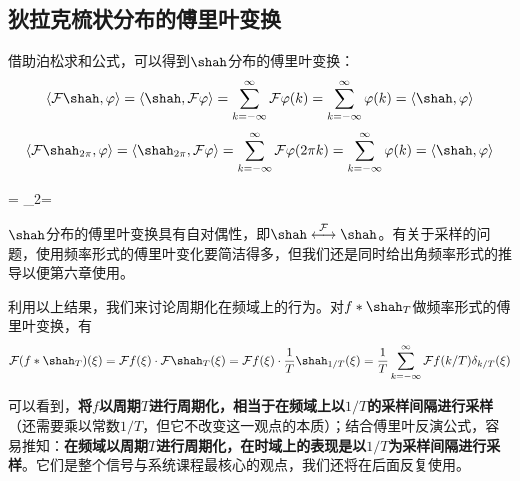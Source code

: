 
\subsection{狄拉克梳状分布的傅里叶变换}\label{sub:fourier_of_dirac_comb}
借助泊松求和公式，可以得到$\shah$分布的傅里叶变换：
{\color{blue}\begin{align*}
    \left\langle \mathcal{F} \shah,\varphi \right\rangle=\left\langle \shah,\mathcal{F} \varphi\right\rangle=\sum_{k=-\infty}^{\infty}\mathcal{F} \varphi(k)=\sum_{k=-\infty}^{\infty}\varphi(k)=\left\langle \shah,\varphi\right\rangle
\end{align*}}
{\color{red}\begin{align*}
    \left\langle \mathcal{F} \shah_{2\pi},\varphi \right\rangle=\left\langle \shah_{2\pi},\mathcal{F} \varphi\right\rangle=\sum_{k=-\infty}^{\infty}\mathcal{F} \varphi(2\pi k)=\sum_{k=-\infty}^{\infty}\varphi(k)=\left\langle \shah,\varphi\right\rangle
\end{align*}}

\begin{proposition}
\begin{lralign}
     \shah=\shah
    \switch
     \shah_{2\pi}=\shah
\end{lralign}
\end{proposition}
$\shah$分布的傅里叶变换具有自对偶性，即{\color{blue}$\shah\overset{\mathcal{F} }{\longleftrightarrow}\shah$}。有关于采样的问题，使用频率形式的傅里叶变化要简洁得多，但我们还是同时给出角频率形式的推导以便第六章使用。

利用以上结果，我们来讨论周期化在频域上的行为。对$f*\shah_T$做频率形式的傅里叶变换，有
{\color{blue}\begin{align*}
    \mathcal{F} (f*\shah_T)(\xi)=\mathcal{F} f(\xi)\cdot\mathcal{F} \shah_T(\xi)=\mathcal{F} f(\xi)\cdot\frac{1}{T}\shah_{1/T}(\xi)=\frac{1}{T}\sum_{k=-\infty}^{\infty}\mathcal{F} f(k/T)\delta_{k/T}(\xi)
\end{align*}}

可以看到，\textbf{将$f$以周期$T$进行周期化，相当于在频域上以$1/T$的采样间隔进行采样}（还需要乘以常数$1/T$，但它不改变这一观点的本质）；结合傅里叶反演公式，容易推知：\textbf{在频域以周期$T$进行周期化，在时域上的表现是以$1/T$为采样间隔进行采样}。它们是整个信号与系统课程最核心的观点，我们还将在后面反复使用。

